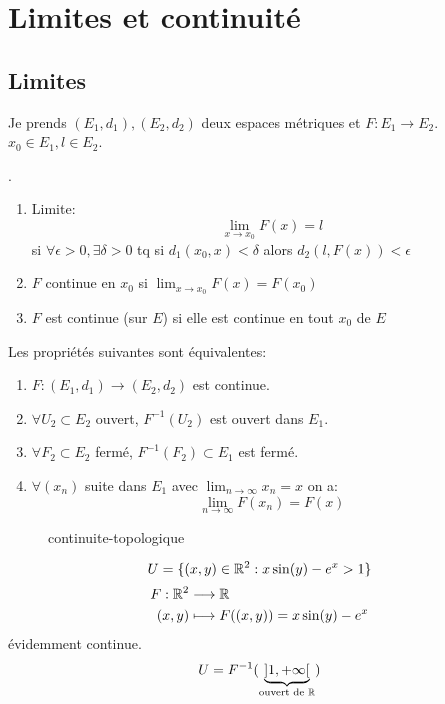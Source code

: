 \section{Limites et continuité}
\subsection{Limites}
Je prends $(E_1, d_1), (E_2, d_2)$ deux espaces métriques et $F: E_1 \to E_2$. $x_0 \in E_1, l \in E_2$.
\begin{definition}.
    \begin{enumerate}
        \item Limite:
            \[
            \lim_{x \to x_0} F(x) = l
            \] 
            si $\forall \epsilon > 0, \exists \delta > 0$ tq si $d_1(x_0, x) < \delta$ alors $d_2(l, F(x)) < \epsilon$
        \item $F$ continue en  $x_0$ si $\lim_{x \to x_0} F(x) = F(x_0)$
        \item $F$ est continue (sur $E$) si elle est continue en tout $x_0$ de $E$
\end{enumerate}
\end{definition}
\begin{prop}
   Les propriétés suivantes sont équivalentes: 
   \begin{enumerate}
       \item $F: (E_1, d_1) \to  (E_2, d_2)$ est continue.
       \item $\forall U_2 \subset  E_2$ ouvert, $F^{-1}(U_2)$ est ouvert dans $E_1$.
       \item $\forall F_2 \subset E_2$ fermé, $F^{-1}(F_2) \subset E_1$ est fermé.
        \item $\forall (x_n)$ suite dans $E_1$ avec $\lim_{n \to \infty} x_n = x$ on a:
            \[
            \lim_{n \to \infty} F(x_n) = F(x)
            \] 
   \end{enumerate}
\end{prop}
\begin{figure}[H]
    \centering
    \caption{continuite-topologique}
    \label{fig:continuite-topologique}
\end{figure}
\begin{eg}
   \[
       U = \{(x, y) \in \mathbb{R}^2: x \sin(y) - e^x > 1\}
   \]  
   \begin{align*}
       F: \mathbb{R}^2 &\longrightarrow \mathbb{R} \\
       (x, y) &\longmapsto F((x, y)) = x \sin(y) - e^x
   \end{align*}
   évidemment continue.
   \[
       U = F^{-1}(\underbrace{]1, +\infty[}_{\text{ouvert de } \mathbb{R}})
   \] 
\end{eg}
